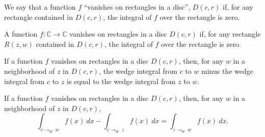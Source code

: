 We say that a function $f$ ``vanishes on rectangles in a disc'', $D(c,r)$ if, for any rectangle
contained in $D(c,r)$, the integral of $f$ over the rectangle is zero.
\begin{definition}
  \label{VanishesOnRectanglesInDisc}
  \leanok
  A function $f:\mathbb C\to\mathbb C$ vanishes on rectangles in a disc $D(c,r)$ if, for any
  rectangle $R(z,w)$ contained in $D(c,r)$, the integral of $f$ over the rectangle is zero.
\end{definition}



If a function $f$ vanishes on rectangles in a disc $D(c,r)$, then, for any $w$ in a neighborhood
of $z$ in $D(c,r)$, the wedge integral from $c$ to $w$ minus the wedge integral from $c$ to $z$
is equal to the wedge integral from $z$ to $w$.
\begin{lemma}
  \label{diff_of_wedges}
  \leanok
  If a function $f$ vanishes on rectangles in a disc $D(c,r)$, then, for any $w$ in a
  neighborhood of $z$ in $D(c,r)$,
  $$
    \int_{c\to_W\  w} f(x)\ dx
    -
    \int_{c\to_W\  z} f(x)\ dx
    =
    \int_{z\to_W\  w} f(x)\ dx
    .
  $$
\end{lemma}


